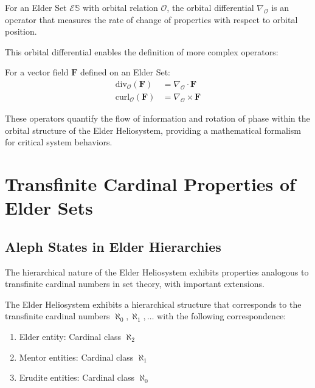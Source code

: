 \begin{definition}
For an Elder Set $\mathcal{E}\mathbb{S}$ with orbital relation $\mathcal{O}$, the orbital differential $\nabla_{\mathcal{O}}$ is an operator that measures the rate of change of properties with respect to orbital position.
\end{definition}

This orbital differential enables the definition of more complex operators:

\begin{definition}
For a vector field $\mathbf{F}$ defined on an Elder Set:
\begin{align}
\text{div}_{\mathcal{O}}(\mathbf{F}) &= \nabla_{\mathcal{O}} \cdot \mathbf{F} \\
\text{curl}_{\mathcal{O}}(\mathbf{F}) &= \nabla_{\mathcal{O}} \times \mathbf{F}
\end{align}
\end{definition}

These operators quantify the flow of information and rotation of phase within the orbital structure of the Elder Heliosystem, providing a mathematical formalism for critical system behaviors.

\section{Transfinite Cardinal Properties of Elder Sets}

\subsection{Aleph States in Elder Hierarchies}

The hierarchical nature of the Elder Heliosystem exhibits properties analogous to transfinite cardinal numbers in set theory, with important extensions.

\begin{theorem}
The Elder Heliosystem exhibits a hierarchical structure that corresponds to the transfinite cardinal numbers $\aleph_0, \aleph_1, \ldots$ with the following correspondence:
\begin{enumerate}
    \item Elder entity: Cardinal class $\aleph_2$
    \item Mentor entities: Cardinal class $\aleph_1$
    \item Erudite entities: Cardinal class $\aleph_0$
\end{enumerate}
\end{theorem}

